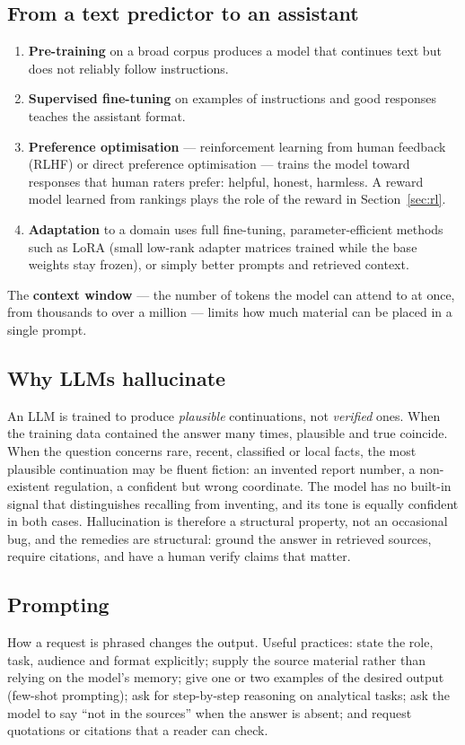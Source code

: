 \documentclass[11pt]{article}
\begin{document}
\subsection{From a text predictor to an assistant}
\begin{enumerate}
\item \textbf{Pre-training} on a broad corpus produces a model that continues text but does not reliably follow instructions.
\item \textbf{Supervised fine-tuning} on examples of instructions and good responses teaches the assistant format.
\item \textbf{Preference optimisation} --- reinforcement learning from human feedback (RLHF) or direct preference optimisation --- trains the model toward responses that human raters prefer: helpful, honest, harmless. A reward model learned from rankings plays the role of the reward in Section~\ref{sec:rl}.
\item \textbf{Adaptation} to a domain uses full fine-tuning, parameter-efficient methods such as LoRA (small low-rank adapter matrices trained while the base weights stay frozen), or simply better prompts and retrieved context.
\end{enumerate}
The \textbf{context window} --- the number of tokens the model can attend to at once, from thousands to over a million --- limits how much material can be placed in a single prompt.

\subsection{Why LLMs hallucinate}
An LLM is trained to produce \emph{plausible} continuations, not \emph{verified} ones. When the training data contained the answer many times, plausible and true coincide. When the question concerns rare, recent, classified or local facts, the most plausible continuation may be fluent fiction: an invented report number, a non-existent regulation, a confident but wrong coordinate. The model has no built-in signal that distinguishes recalling from inventing, and its tone is equally confident in both cases. Hallucination is therefore a structural property, not an occasional bug, and the remedies are structural: ground the answer in retrieved sources, require citations, and have a human verify claims that matter.

\subsection{Prompting}
How a request is phrased changes the output. Useful practices: state the role, task, audience and format explicitly; supply the source material rather than relying on the model's memory; give one or two examples of the desired output (few-shot prompting); ask for step-by-step reasoning on analytical tasks; ask the model to say ``not in the sources'' when the answer is absent; and request quotations or citations that a reader can check.
\end{document}
